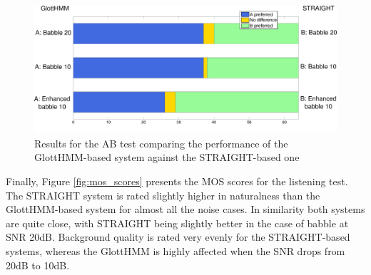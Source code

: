 \begin{figure}[!htb]
  \begin{centering}
  \includegraphics[width=\textwidth]{images/glott_vs_st.pdf}
  \caption{Results for the AB test comparing the performance of the GlottHMM-based system against the STRAIGHT-based one}
  \label{fig:glott_vs_st}
  \end{centering}
\end{figure}

Finally, Figure \ref{fig:mos_scores} presents the MOS scores for the listening test.
%
The STRAIGHT system is rated slightly higher in naturalness than the GlottHMM-based system for almost all the noise cases.
%
In similarity both systems are quite close, with STRAIGHT being slightly better in the case of babble at SNR 20dB.
%
Background quality is rated very evenly for the STRAIGHT-based systems, whereas the GlottHMM is highly affected when the SNR drops from 20dB to 10dB.

